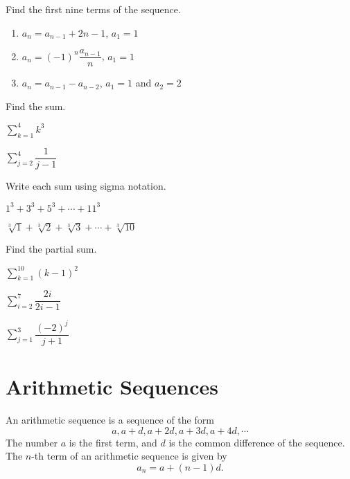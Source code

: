 \begin{exercise}
    Find the first nine terms of the sequence.
\begin{enumerate}
    \item $a_n=a_{n-1}+2n-1$, $a_1=1$
    \item $a_n=(-1)^n\dfrac{a_{n-1}}{n}$, $a_1=1$
    \item $a_n=a_{n-1}-a_{n-2}$, $a_1=1$ and $a_2=2$
\end{enumerate}
\end{exercise}

\newpage

\begin{exercise}
  Find the sum.\\
  \begin{enumerate*}
      \item $\sum\limits_{k=1}^4 k^3$
      \item $\sum\limits_{j=2}^4\dfrac{1}{j-1}$\hfill\null
  \end{enumerate*}
\end{exercise}

\begin{exercise}
  Write each sum using sigma notation.\\
  \begin{enumerate*}
      \item $1^3+3^3+5^3+\cdots+11^3$
      \item $\sqrt[3]{1}+\sqrt[3]{2}+\sqrt[3]{3}+\cdots+\sqrt[3]{10}$\hfill\null
  \end{enumerate*}
\end{exercise}

\begin{exercise}
  Find the partial sum.\\
  \begin{enumerate*}
      \item $\sum\limits_{k=1}^{10}(k-1)^2$
      \item $\sum\limits_{i=2}^{7}\dfrac{2i}{2i-1}$
      \item $\sum\limits_{j=1}^{3}\dfrac{(-2)^j}{j+1}$\hfill\null
  \end{enumerate*}
\end{exercise}

\newpage

\section{Arithmetic Sequences}

\begin{definition}
 An arithmetic sequence is a sequence of the form
\[a, a+d, a+2d, a+3d, a+4d, \cdots\]
The number $a$ is the first term, and $d$ is the common difference of the sequence. The $n$-th term of an arithmetic sequence is given by
\[a_n=a+(n-1)d.\]
\end{definition}

